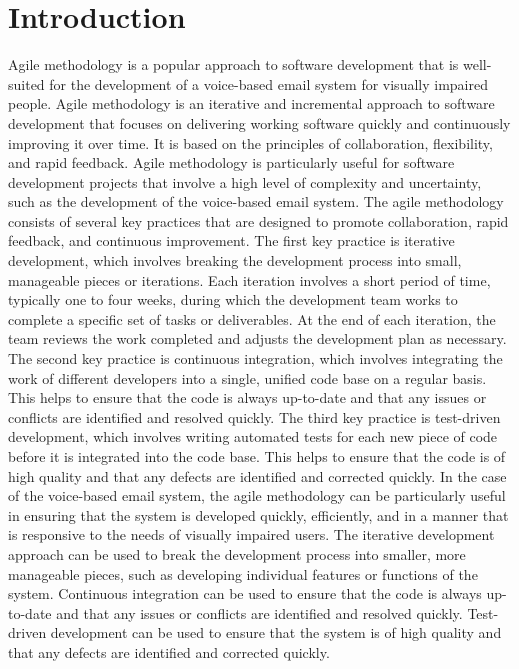 \documentclass[12pt]{report}
\begin{document}
\section{Introduction}
Agile methodology is a popular approach to software development that is well-suited for the development of a voice-based email system for visually impaired people. Agile methodology is an iterative and incremental approach to software development that focuses on delivering working software quickly and continuously improving it over time. It is based on the principles of collaboration, flexibility, and rapid feedback. Agile methodology is particularly useful for software development projects that involve a high level of complexity and uncertainty, such as the development of the voice-based email system.\newline \newline
The agile methodology consists of several key practices that are designed to promote collaboration, rapid feedback, and continuous improvement. The first key practice is iterative development, which involves breaking the development process into small, manageable pieces or iterations. Each iteration involves a short period of time, typically one to four weeks, during which the development team works to complete a specific set of tasks or deliverables. At the end of each iteration, the team reviews the work completed and adjusts the development plan as necessary.\newline \newline
The second key practice is continuous integration, which involves integrating the work of different developers into a single, unified code base on a regular basis. This helps to ensure that the code is always up-to-date and that any issues or conflicts are identified and resolved quickly. The third key practice is test-driven development, which involves writing automated tests for each new piece of code before it is integrated into the code base. This helps to ensure that the code is of high quality and that any defects are identified and corrected quickly.\newline \newline
In the case of the voice-based email system, the agile methodology can be particularly useful in ensuring that the system is developed quickly, efficiently, and in a manner that is responsive to the needs of visually impaired users. The iterative development approach can be used to break the development process into smaller, more manageable pieces, such as developing individual features or functions of the system. Continuous integration can be used to ensure that the code is always up-to-date and that any issues or conflicts are identified and resolved quickly. Test-driven development can be used to ensure that the system is of high quality and that any defects are identified and corrected quickly. 
\end{document}
